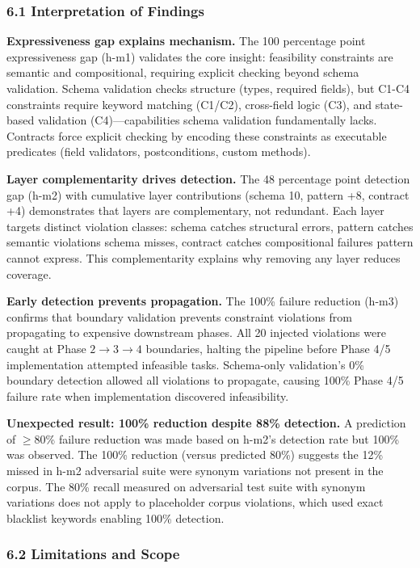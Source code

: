 
\subsubsection{6.1 Interpretation of Findings}

\textbf{Expressiveness gap explains mechanism.} The 100 percentage point expressiveness gap (h-m1) validates the core insight: feasibility constraints are semantic and compositional, requiring explicit checking beyond schema validation. Schema validation checks structure (types, required fields), but C1-C4 constraints require keyword matching (C1/C2), cross-field logic (C3), and state-based validation (C4)---capabilities schema validation fundamentally lacks. Contracts force explicit checking by encoding these constraints as executable predicates (field validators, postconditions, custom methods).

\textbf{Layer complementarity drives detection.} The 48 percentage point detection gap (h-m2) with cumulative layer contributions (schema 10, pattern +8, contract +4) demonstrates that layers are complementary, not redundant. Each layer targets distinct violation classes: schema catches structural errors, pattern catches semantic violations schema misses, contract catches compositional failures pattern cannot express. This complementarity explains why removing any layer reduces coverage.

\textbf{Early detection prevents propagation.} The 100\% failure reduction (h-m3) confirms that boundary validation prevents constraint violations from propagating to expensive downstream phases. All 20 injected violations were caught at Phase $2\rightarrow 3\rightarrow 4$ boundaries, halting the pipeline before Phase 4/5 implementation attempted infeasible tasks. Schema-only validation's 0\% boundary detection allowed all violations to propagate, causing 100\% Phase 4/5 failure rate when implementation discovered infeasibility.

\textbf{Unexpected result: 100\% reduction despite 88\% detection.} A prediction of $\geq 80$\% failure reduction was made based on h-m2's detection rate but 100\% was observed. The 100\% reduction (versus predicted 80\%) suggests the 12\% missed in h-m2 adversarial suite were synonym variations not present in the corpus. The 80\% recall measured on adversarial test suite with synonym variations does not apply to placeholder corpus violations, which used exact blacklist keywords enabling 100\% detection.

\subsubsection{6.2 Limitations and Scope}

